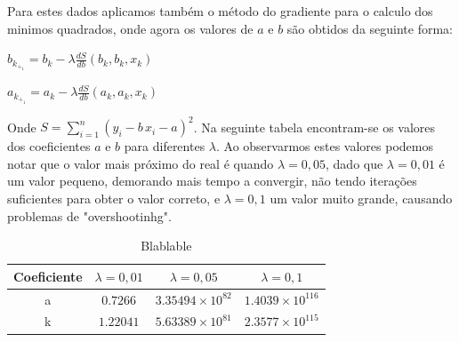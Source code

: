\documentclass[aps,pre,twocolumn,showpacs,amsmath,amssymb]{revtex4-1}
\begin{document}
    Para estes dados aplicamos também o método do gradiente para o calculo dos minimos quadrados, onde agora os valores de $a$ e $b$ são obtidos da seguinte forma:

    \begin{center}
        $b_k_+_1 = b_k - \lambda\frac{dS}{db}(b_k, b_k, x_k)$

        $a_k_+_1 = a_k - \lambda\frac{dS}{db}(a_k, a_k, x_k)$
    \end{center}

    Onde $S = \sum^n_{i=1} (y_i - b\,x_i - a)^2$. Na seguinte tabela encontram-se os valores dos coeficientes $a$ e $b$ para diferentes $\lambda$. Ao observarmos estes valores podemos notar que o valor mais próximo do real é quando $\lambda = 0,05$, dado que $\lambda = 0,01$ é um valor pequeno, demorando mais tempo a convergir, não tendo iterações suficientes para obter o valor correto, e $\lambda = 0,1$ um valor muito grande, causando problemas de "overshootinhg".

    \begin{table}[hbt!]
        \centering
        \caption{Blablable}
        \begin{tabular}{|c|c|c|c|}
            \hline Coeficiente & $\lambda = 0,01$ & $\lambda = 0,05$ & $\lambda = 0,1$ \\
            \hline a & $0.7266$ & $3.35494 \times 10^{82}$ & $1.4039 \times 10^{116}$  \\
            \hline k & $1.22041$ & $5.63389 \times 10^{81}$ & $2.3577 \times 10^{115}$  \\
            \hline
        \end{tabular}
        \label{tab:my-table}
    \end{table}

\end{document}
